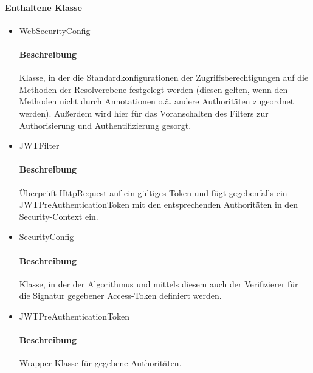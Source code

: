 \paragraph*{Enthaltene Klasse}
\begin{itemize}
	\item WebSecurityConfig
	\paragraph*{Beschreibung}
			Klasse, in der die Standardkonfigurationen der Zugriffsberechtigungen auf die Methoden 
			der Resolverebene festgelegt werden (diesen gelten, wenn den Methoden nicht durch Annotationen o.ä. andere
			Authoritäten zugeordnet werden). Außerdem wird hier für das Voranschalten des Filters zur Authorisierung und Authentifizierung gesorgt.
    \item JWTFilter
    		\paragraph*{Beschreibung}
    		Überprüft HttpRequest auf ein gültiges Token und fügt gegebenfalls ein JWTPreAuthenticationToken mit den entsprechenden Authoritäten in den Security-Context ein.
	\item SecurityConfig
			\paragraph*{Beschreibung}
			Klasse, in der der Algorithmus und mittels diesem auch der Verifizierer für die Signatur gegebener Access-Token definiert werden.		
	\item JWTPreAuthenticationToken
    		\paragraph*{Beschreibung}
			Wrapper-Klasse für gegebene Authoritäten.
\end{itemize}
